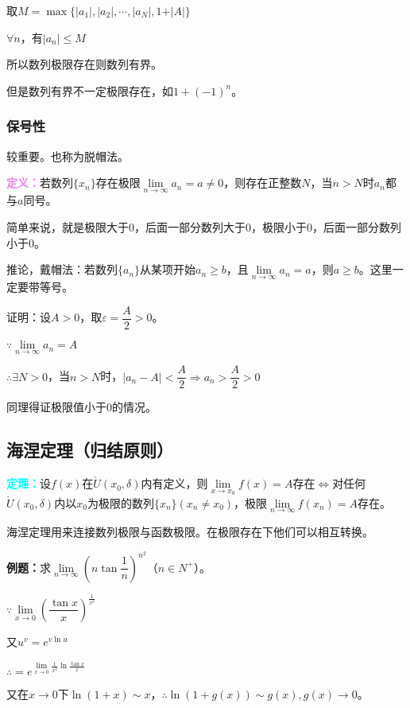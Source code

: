 \documentclass[UTF8, 12pt]{ctexart}
\begin{document}
取$M=\max\{\vert a_1\vert,\vert a_2\vert,\cdots,\vert a_N\vert,1+\vert A\vert\}$

$\forall n$，有$\vert a_n\vert\leqslant M$

所以数列极限存在则数列有界。

但是数列有界不一定极限存在，如$1+(-1)^n$。

\subsubsection{保号性}

较重要。也称为脱帽法。

\textcolor{violet}{\textbf{定义：}}若数列$\{x_n\}$存在极限$\lim\limits_{n\to\infty}a_n=a\neq 0$，则存在正整数$N$，当$n>N$时$a_n$都与$a$同号。

简单来说，就是极限大于0，后面一部分数列大于0，极限小于0，后面一部分数列小于0。

推论，戴帽法：若数列$\{a_n\}$从某项开始$a_n\geqslant b$，且$\lim\limits_{n\to\infty}a_n=a$，则$a\geqslant b$。这里一定要带等号。

证明：设$A>0$，取$\varepsilon=\dfrac{A}{2}>0$。

$\because\lim\limits_{n\to\infty}a_n=A$

$\therefore\exists N>0$，当$n>N$时，$\vert a_n-A\vert<\dfrac{A}{2}\Rightarrow a_n>\dfrac{A}{2}>0$

同理得证极限值小于0的情况。

\subsection{海涅定理（归结原则）}

\textcolor{aqua}{\textbf{定理：}}设$f(x)$在$\mathring{U}(x_0,\delta)$内有定义，则$\lim\limits_{x\to x_0}f(x)=A$存在$\Leftrightarrow$对任何$\mathring{U}(x_0,\delta)$内以$x_0$为极限的数列$\{x_n\}(x_n\neq x_0)$，极限$\lim\limits_{n\to\infty}f(x_n)=A$存在。

海涅定理用来连接数列极限与函数极限。在极限存在下他们可以相互转换。

\textbf{例题：}求$\lim\limits_{n\to\infty}\left(n\tan\dfrac{1}{n}\right)^{n^2}$（$n\in N^+$）。

$\because \lim\limits_{x\to 0}\left(\dfrac{\tan x}{x}\right)^{\frac{1}{x^2}}$

又$u^v=e^{v\ln u}$

$\therefore =e^{\lim\limits_{x\to 0}\frac{1}{x^2}\ln\frac{\tan x}{x}}$

又在$x\to 0$下$\ln (1+x)\sim x$，$\therefore \ln(1+g(x))\sim g(x),g(x)\to 0$。
\end{document}

